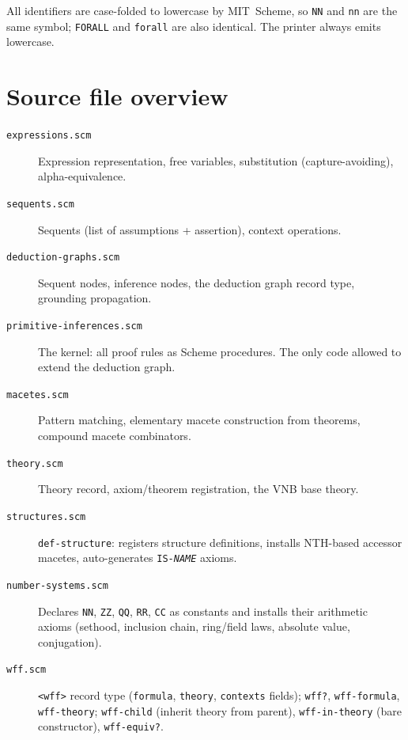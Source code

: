 \documentclass{amsbook}[openany]
\theoremstyle{definition}
\theoremstyle{remark}
\theoremstyle{remark}
\begin{document}
\noindent
All identifiers are case-folded to lowercase by MIT~Scheme, so
\texttt{NN} and \texttt{nn} are the same symbol; \texttt{FORALL} and
\texttt{forall} are also identical.  The printer always emits lowercase.

\chapter{Source file overview}

\begin{description}

\item[\texttt{expressions.scm}]
  Expression representation, free variables, substitution
  (capture-avoiding), alpha-equivalence.

\item[\texttt{sequents.scm}]
  Sequents (list of assumptions + assertion), context operations.

\item[\texttt{deduction-graphs.scm}]
  Sequent nodes, inference nodes, the deduction graph record type,
  grounding propagation.

\item[\texttt{primitive-inferences.scm}]
  The kernel: all proof rules as Scheme procedures.  The only code
  allowed to extend the deduction graph.

\item[\texttt{macetes.scm}]
  Pattern matching, elementary macete construction from theorems,
  compound macete combinators.

\item[\texttt{theory.scm}]
  Theory record, axiom/theorem registration, the VNB base theory.

\item[\texttt{structures.scm}]
  \texttt{def-structure}: registers structure definitions, installs
  NTH-based accessor macetes, auto-generates \texttt{IS-\textit{NAME}}
  axioms.

\item[\texttt{number-systems.scm}]
  Declares \texttt{NN}, \texttt{ZZ}, \texttt{QQ}, \texttt{RR},
  \texttt{CC} as constants and installs their arithmetic axioms
  (sethood, inclusion chain, ring/field laws, absolute value,
  conjugation).

\item[\texttt{wff.scm}]
  \texttt{<wff>} record type (\texttt{formula}, \texttt{theory},
  \texttt{contexts} fields); \texttt{wff?}, \texttt{wff-formula},
  \texttt{wff-theory}; \texttt{wff-child} (inherit theory from parent),
  \texttt{wff-in-theory} (bare constructor), \texttt{wff-equiv?}.


\end{description}
\end{document}
